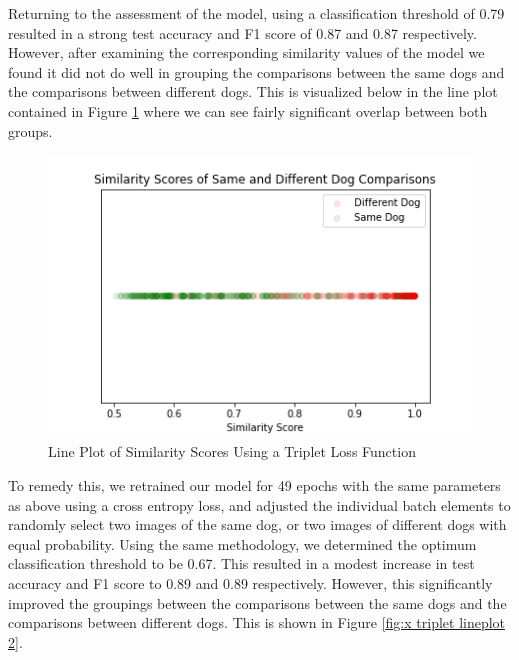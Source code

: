\documentclass{article}
\begin{document}
Returning to the assessment of the model, using a classification threshold of 0.79 resulted in a strong test accuracy and F1 score of 0.87 and 0.87 respectively.  However, after examining the corresponding similarity values of the model we found it did not do well in grouping the comparisons between the same dogs and the comparisons between different dogs.  This is visualized below in the line plot contained in Figure \ref{fig:x triplet lineplot} where we can see fairly significant overlap between both groups.

\begin{figure}[h]
\centering
	\includegraphics[scale=0.7]{final-report-images/triplet_lineplot.png}
\caption{Line Plot of Similarity Scores Using a Triplet Loss Function}
\label{fig:x triplet lineplot}
\end{figure}
\noindent To remedy this, we retrained our model for 49 epochs with the same parameters as above using a cross entropy loss, and adjusted the individual batch elements to randomly select two images of the same dog, or two images of different dogs with equal probability.  Using the same methodology, we determined the optimum classification threshold to be 0.67.  This resulted in a modest increase in test accuracy and F1 score to 0.89 and 0.89 respectively.  However, this significantly improved the groupings between the comparisons between the same dogs and the comparisons between different dogs. This is shown in Figure \ref{fig:x triplet lineplot 2}. 
\end{document}
